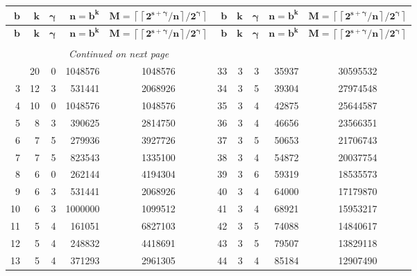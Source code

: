 \documentclass[a4paper,10pt]{article}
\providecommand{\ceil}[1]{\left\lceil#1\right\rceil}
\theoremstyle{plain} %
\theoremstyle{definition}
\theoremstyle{remark}
\begin{document}
\begin{center}
\begin{longtable}{r r r r c | r r r r c}
\multicolumn{1}{r}{$\mathbf{b}$}&
\multicolumn{1}{r}{$\mathbf{k}$}&
\multicolumn{1}{r}{$\mathbf{\gamma}$}&
\multicolumn{1}{r}{$\mathbf{n = b^k}$}&
\multicolumn{1}{c}{$\mathbf{M = \ceil{\ceil{2^{s+\gamma}/n}/2^\gamma}}$}&
\multicolumn{1}{r}{$\mathbf{b}$}&
\multicolumn{1}{r}{$\mathbf{k}$}&
\multicolumn{1}{r}{$\mathbf{\gamma}$}&
\multicolumn{1}{r}{$\mathbf{n = b^k}$}&
\multicolumn{1}{c}{$\mathbf{M = \ceil{\ceil{2^{s+\gamma}/n}/2^\gamma}}$}\\
\endfirsthead
%
\multicolumn{1}{r}{$\mathbf{b}$}&
\multicolumn{1}{r}{$\mathbf{k}$}&
\multicolumn{1}{r}{$\mathbf{\gamma}$}&
\multicolumn{1}{r}{$\mathbf{n = b^k}$}&
\multicolumn{1}{c}{$\mathbf{M = \ceil{\ceil{2^{s+\gamma}/n}/2^\gamma}}$}&
\multicolumn{1}{r}{$\mathbf{b}$}&
\multicolumn{1}{r}{$\mathbf{k}$}&
\multicolumn{1}{r}{$\mathbf{\gamma}$}&
\multicolumn{1}{r}{$\mathbf{n = b^k}$}&
\multicolumn{1}{c}{$\mathbf{M = \ceil{\ceil{2^{s+\gamma}/n}/2^\gamma}}$}\\
\endhead
\rule{0pt}{1ex}\\
\multicolumn{6}{c}{{\footnotesize{\textit{Continued on next page}}}} \\
\endfoot
\endlastfoot
2  & 20 & 0 & 1048576 & 1048576  &  33 & 3  & 3 & 35937   & 30595532 \\
3  & 12 & 3 & 531441  & 2068926  &  34 & 3  & 5 & 39304   & 27974548 \\
4  & 10 & 0 & 1048576 & 1048576  &  35 & 3  & 4 & 42875   & 25644587 \\
5  & 8  & 3 & 390625  & 2814750  &  36 & 3  & 4 & 46656   & 23566351 \\
6  & 7  & 5 & 279936  & 3927726  &  37 & 3  & 5 & 50653   & 21706743 \\
7  & 7  & 5 & 823543  & 1335100  &  38 & 3  & 4 & 54872   & 20037754 \\
8  & 6  & 0 & 262144  & 4194304  &  39 & 3  & 6 & 59319   & 18535573 \\
9  & 6  & 3 & 531441  & 2068926  &  40 & 3  & 4 & 64000   & 17179870 \\
10 & 6  & 3 & 1000000 & 1099512  &  41 & 3  & 4 & 68921   & 15953217 \\
11 & 5  & 4 & 161051  & 6827103  &  42 & 3  & 5 & 74088   & 14840617 \\
12 & 5  & 4 & 248832  & 4418691  &  43 & 3  & 5 & 79507   & 13829118 \\
13 & 5  & 4 & 371293  & 2961305  &  44 & 3  & 4 & 85184   & 12907490\\

\end{longtable}
\end{center}
\end{document}
